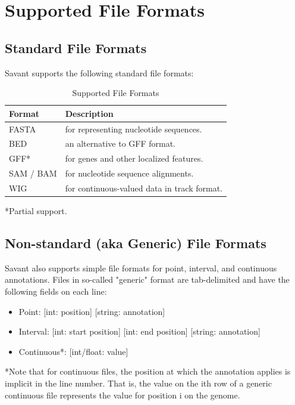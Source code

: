 \documentclass{report}
\begin{document}
\section{Supported File Formats}

\subsection{Standard File Formats}

Savant supports the following standard file formats:

\begin{table}[ht] 
\caption{Supported File Formats}  
\begin{tabular*}{6in}{ l l }  
\hline                      
Format & Description \\
\hline                    
FASTA & for representing nucleotide sequences.  \\
BED & an alternative to GFF format. \\
GFF* & for genes and other localized features. \\   
SAM / BAM & for nucleotide  sequence alignments. \\
WIG & for continuous-valued data in track format. \\      
\hline     
\end{tabular*} 
\end{table} 

*Partial support.

\subsection{Non-standard (aka Generic) File Formats}

Savant also supports simple file formats for point, interval, and continuous annotations. Files in so-called "generic" format are tab-delimited and have the following fields on each line:

\begin{itemize}
\item Point: [int: position] [string: annotation]
\item Interval: [int: start position] [int: end position] [string: annotation]
\item Continuous*: [int/float: value]
\end{itemize}

*Note that for continuous files, the position at which the annotation applies is implicit in the line number. That is, the value on the ith row of a generic continuous file represents the value for position i on the genome. \\
\end{document}
